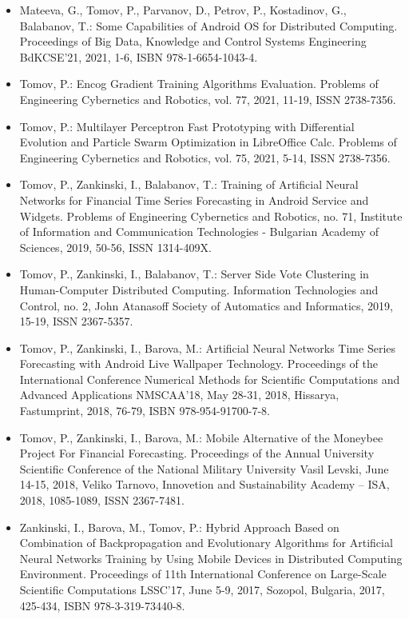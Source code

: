 \begin{itemize}
\item Mateeva, G., Tomov, P., Parvanov, D., Petrov, P., Kostadinov, G., Balabanov, T.: Some Capabilities of Android OS for Distributed Computing. Proceedings of Big Data, Knowledge and Control Systems Engineering BdKCSE’21, 2021, 1-6, ISBN 978-1-6654-1043-4.

\item Tomov, P.: Encog Gradient Training Algorithms Evaluation. Problems of Engineering Cybernetics and Robotics, vol. 77, 2021, 11-19, ISSN 2738-7356.

\item Tomov, P.: Multilayer Perceptron Fast Prototyping with Differential Evolution and Particle Swarm Optimization in LibreOffice Calc. Problems of Engineering Cybernetics and Robotics, vol. 75, 2021, 5-14, ISSN 2738-7356.

\item Tomov, P., Zankinski, I., Balabanov, T.: Training of Artificial Neural Networks for Financial Time Series Forecasting in Android Service and Widgets. Problems of Engineering Cybernetics and Robotics, no. 71, Institute of Information and Communication Technologies - Bulgarian Academy of Sciences, 2019, 50-56, ISSN 1314-409X.

\item Tomov, P., Zankinski, I., Balabanov, T.: Server Side Vote Clustering in Human-Computer Distributed Computing. Information Technologies and Control, no. 2, John Atanasoff Society of Automatics and Informatics, 2019, 15-19, ISSN 2367-5357.

\item Tomov, P., Zankinski, I., Barova, M.: Artificial Neural Networks Time Series Forecasting with Android Live Wallpaper Technology. Proceedings of the International Conference Numerical Methods for Scientific Computations and Advanced Applications NMSCAA’18, May 28-31, 2018, Hissarya, Fastumprint, 2018, 76-79, ISBN 978-954-91700-7-8.

\item Tomov, P., Zankinski, I., Barova, M.: Mobile Alternative of the Moneybee Project For Financial Forecasting. Proceedings of the Annual University Scientific  Conference of the National Military University Vasil Levski, June 14-15, 2018, Veliko Tarnovo, Innovetion and Sustainability Academy – ISA, 2018, 1085-1089, ISSN 2367-7481.

\item Zankinski, I., Barova, M., Tomov, P.: Hybrid Approach Based on Combination of Backpropagation and Evolutionary Algorithms for Artificial Neural Networks Training by Using Mobile Devices in Distributed Computing Environment. Proceedings of 11th International Conference on Large-Scale Scientific Computations LSSC'17, June 5-9, 2017, Sozopol, Bulgaria, 2017, 425-434, ISBN 978-3-319-73440-8.


\end{itemize}

